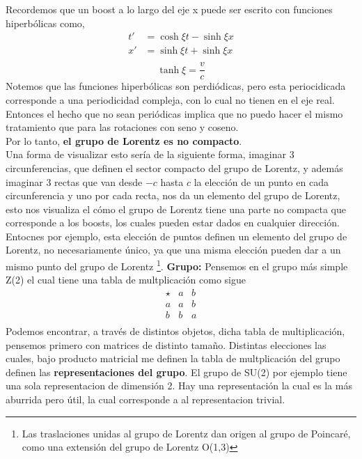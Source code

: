 \documentclass[../main.tex]{subfiles}
\begin{document}
Recordemos que un boost a lo largo del eje x puede ser escrito con funciones hiperbólicas como,
\begin{align*}
  t' & = \cosh \xi t - \sinh \xi x \\
  x' & = \sinh \xi t + \sinh \xi x \\
\end{align*}
\begin{equation*}
  \boxed{ \tanh \xi = \frac{v}{c}}
\end{equation*}
Notemos que las funciones hiperbólicas son perdiódicas, pero esta periocidicada corresponde a una periodicidad compleja, con lo cual no tienen en el eje real. Entonces el hecho que no sean periódicas implica que no puedo hacer el mismo tratamiento que para las rotaciones con seno y coseno. \\
Por lo tanto, \textbf{ el  grupo de Lorentz es no compacto}. \\
Una forma de visualizar esto sería de la siguiente forma, imaginar 3 circunferencias, que definen el sector compacto del grupo de Lorentz, y además imaginar 3 rectas que van desde $-c$ hasta $c$ la elección de un punto en cada circunferencia y uno por cada recta, nos da un elemento del grupo de Lorentz, esto nos visualiza el cómo el grupo de Lorentz tiene una parte no compacta que corresponde a los boosts, los cuales pueden estar dados en cualquier dirección. Entocnes por ejemplo, esta elección de puntos definen un elemento del grupo de Lorentz, no necesariamente único, ya que una misma elección pueden dar a un mismo punto del grupo de Lorentz \footnote{Las traslaciones unidas al grupo de Lorentz dan origen al grupo de Poincaré, como una extensión del grupo de Lorentz O(1,3)}.
\textbf{Grupo:}
Pensemos en el grupo más simple Z(2) el cual tiene una tabla de multplicación como sigue
\begin{equation*}
\begin{array}{c|cc}
  \star & a & b \\
  \hline
  a & a & b \\
  b & b & a \\
\end{array}
\end{equation*}
Podemos encontrar, a través de distintos objetos, dicha tabla de multiplicación, pensemos primero con matrices de distinto tamaño. Distintas elecciones las cuales, bajo producto matricial me definen la tabla de multplicación del grupo definen las \textbf{representaciones del grupo}. El grupo de SU(2) por ejemplo tiene una sola representacion de dimensión 2. Hay una representación la cual es la más aburrida pero útil, la cual corresponde a al representacion trivial.
\end{document}
